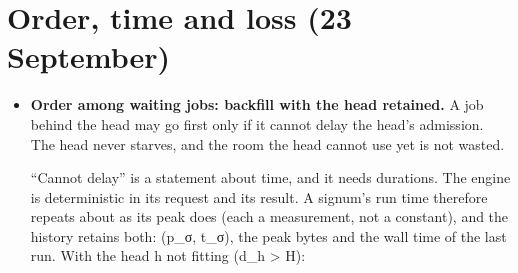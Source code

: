 \section{\texorpdfstring{Order, time and loss (23 September)}{Order, time and loss (23 September)}}

\begin{itemize}
\item \textbf{Order among waiting jobs: backfill with the head retained.} A job behind the head may go first only if it cannot delay the head's admission. The head never starves, and the room the head cannot use yet is not wasted.

“Cannot delay” is a statement about time, and it needs durations. The engine is deterministic in its request and its result. A signum's run time therefore repeats about as its peak does (each a measurement, not a constant), and the history retains both: (p\_\allowbreak{}σ, t\_\allowbreak{}σ), the peak bytes and the wall time of the last run. With the head h not fitting (d\_\allowbreak{}h > H):


\end{itemize}
